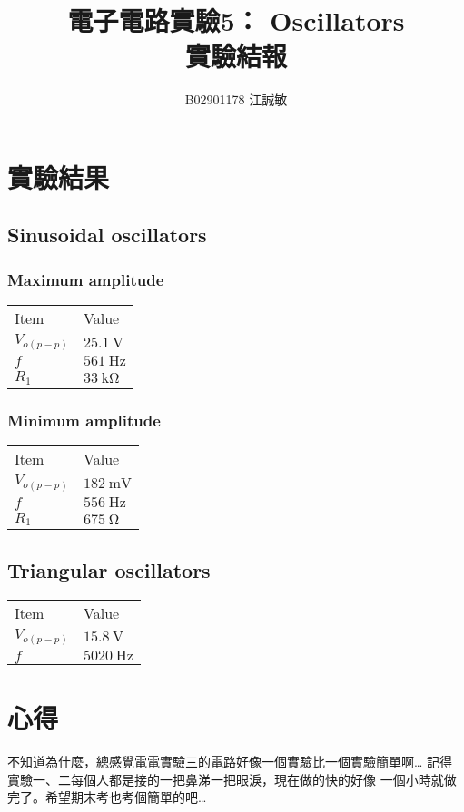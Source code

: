 \documentclass[12pt, a4paper]{article}
\title{ \bf {\Huge 電子電路實驗5： Oscillators}\\ 實驗結報}
\author{B02901178 江誠敏}
\begin{document}
\maketitle


\section{實驗結果}
\subsection{Sinusoidal oscillators}
\subsubsection{Maximum amplitude}
\begin{center}
\begin{tabular}{p{3cm}p{3cm}}
	\hline
  Item & Value\\
	\hhline{==}
  $V_{o(p-p)}$ & $\SI{25.1}\V$ \\
  $f$ & $\SI{561}\Hz$ \\
  $R_{1}$ & $\SI{33}\kohm$ \\
	\hline
\end{tabular}
\end{center}

\subsubsection{Minimum amplitude}
\begin{center}
\begin{tabular}{p{3cm}p{3cm}}
	\hline
  Item & Value\\
	\hhline{==}
  $V_{o(p-p)}$ & $\SI{182}\mV$ \\
  $f$ & $\SI{556}\Hz$ \\
  $R_{1}$ & $\SI{675}\ohm$ \\
	\hline
\end{tabular}
\end{center}

\subsection{Triangular oscillators}
\begin{center}
\begin{tabular}{p{3cm}p{3cm}}
	\hline
  Item & Value\\
	\hhline{==}
  $V_{o(p-p)}$ & $\SI{15.8}\V$ \\
  $f$ & $\SI{5020}\Hz$ \\
	\hline
\end{tabular}
\end{center}

\section{心得}
不知道為什麼，總感覺電電實驗三的電路好像一個實驗比一個實驗簡單啊…
記得實驗一、二每個人都是接的一把鼻涕一把眼淚，現在做的快的好像
一個小時就做完了。希望期末考也考個簡單的吧…
\end{document}
